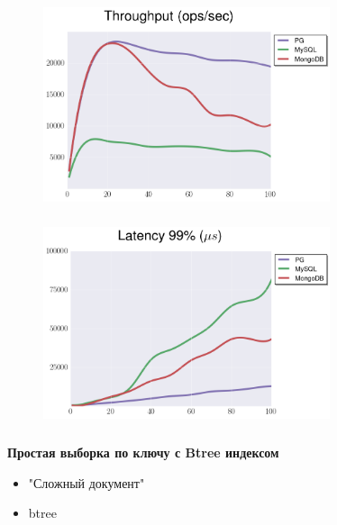 \documentclass[usenames,dvipsnames, 18pt, compress, aspectratio=169]{beamer}
\begin{document}
\begin{frame}
    \frametitle{}
    \begin{center}
    \begin{figure}
        \includegraphics[width=0.75\textwidth,center]{benchmarks/select_btree_throughput.png}
    \end{figure}
    \end{center}
\end{frame}

\begin{frame}
    \frametitle{}
    \begin{center}
    \begin{figure}
        \includegraphics[width=0.75\textwidth,center]{benchmarks/select_btree_latency.png}
    \end{figure}
    \end{center}
\end{frame}

\begin{frame}
    \frametitle{}
    \begin{center}
        \textbf{Простая выборка по ключу с Btree индексом}
        \begin{itemize}[label={}]
            \item "Сложный документ"
            \item btree
        \end{itemize}
    \end{center}
\end{frame}
\end{document}
